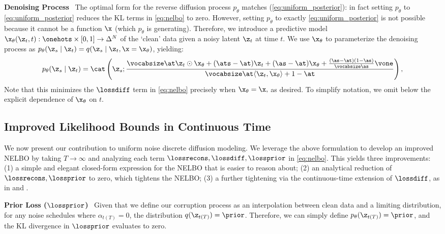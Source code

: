 \documentclass{article} %
\begin{document}
\textbf{Denoising Process}~
The optimal form for the reverse diffusion process $p_\theta$ matches (\ref{eq:uniform_posterior}): in fact setting $p_\theta$ to \eqref{eq:uniform_posterior} reduces the KL terms in \eqref{eq:nelbo} to zero. However, setting $p_\theta$ to exactly \eqref{eq:uniform_posterior} is not possible because it cannot be a function $\x$ (which $p_\theta$ is generating). 
Therefore, we introduce a predictive model $\x_\theta(\z_t, t): \onehots \times [0, 1] \rightarrow \Delta^N$ of the `clean' data given a noisy latent $\z_t$ at time $t$. We use $\x_\theta$ to parameterize the denoising process as $p_\theta(\z_s \mid \z_t) = q(\z_s \mid \z_t, \x = \x_\theta)$, yielding:
\begin{equation}\label{eq:uniform_posterior_pred}
    p_\theta(\z_s \mid \z_t)
    = \cat \left(
        \z_s;
        \frac{
            \vocabsize\at \z_t \odot \x_\theta + (\ats - \at)\z_t + (\as - \at)\x_\theta + \frac{(\as - \at)(1- \as)}{\vocabsize\as}\vone
            }
            {
             \vocabsize \at\langle \z_t, \x_\theta\rangle  + 1 - \at
            }
        \right),
\end{equation}
Note that this minimizes the $\lossdiff$ term in \eqref{eq:nelbo} precisely when $\x_\theta = \x,$ as desired.
To simplify notation, we omit below the explicit dependence of $\x_\theta$ on $t$.

\subsection{Improved Likelihood Bounds in Continuous Time}\label{subsec:udlm_elbo}
We now present our contribution to uniform noise discrete diffusion modeling.
We leverage the above formulation to develop an improved NELBO by taking $T\rightarrow\infty$ and analyzing each term $\lossrecons, \lossdiff, \lossprior$ in \eqref{eq:nelbo}.
This yields three improvements: (1) a simple and elegant closed-form expression for the NELBO that is easier to reason about; (2) an analytical reduction of $\lossrecons, \lossprior$ to zero, which tightens the NELBO; (3) a further tightening via the continuous-time extension of $\lossdiff$, as in \citet{kingma2021variational} and \citet{sahoo2024simple,sahoo2024mulan}.

\textbf{Prior Loss ($\lossprior$)}~
Given that we define our corruption process as an interpolation between clean data and a limiting distribution, for any noise schedules where $\alpha_{t(T)} = 0$, the distribution $q(\z_{t(T)}) = \prior$.
Therefore, we can simply define $p_\theta(\z_{t(T)}) = \prior$, and the KL divergence in $\lossprior$ evaluates to zero.
\end{document}

